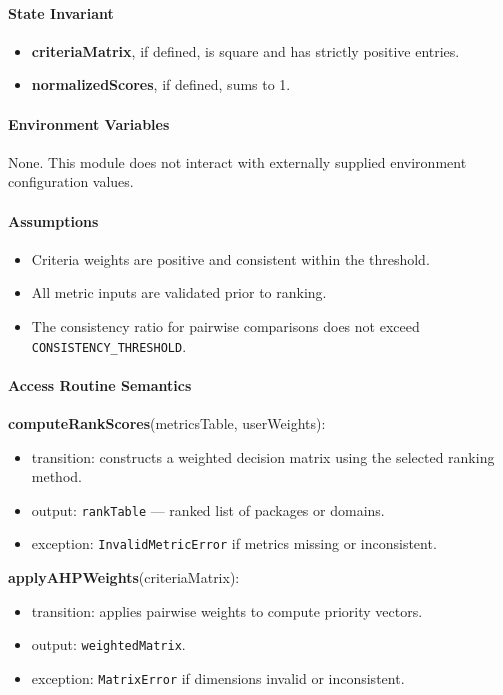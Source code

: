 \documentclass[12pt, titlepage]{article}
\begin{document}
  \paragraph{State Invariant}
  \begin{itemize}
    \item \textbf{criteriaMatrix}, if defined, is square and has strictly positive entries.
    \item \textbf{normalizedScores}, if defined, sums to 1.
  \end{itemize}

  \paragraph{Environment Variables}
  None. This module does not interact with externally supplied
  environment configuration values.

\paragraph{Assumptions}
\begin{itemize}
  \item Criteria weights are positive and consistent within the threshold.
  \item All metric inputs are validated prior to ranking.
  \item The consistency ratio for pairwise comparisons does not exceed \texttt{CONSISTENCY\_THRESHOLD}.
\end{itemize}

  \paragraph{Access Routine Semantics}

\noindent \textbf{computeRankScores}(metricsTable, userWeights):
\begin{itemize}
  \item transition: constructs a weighted decision matrix using the selected ranking method.
  \item output: \texttt{rankTable} — ranked list of packages or domains.
  \item exception: \texttt{InvalidMetricError} if metrics missing or inconsistent.
\end{itemize}

\noindent \textbf{applyAHPWeights}(criteriaMatrix):
\begin{itemize}
  \item transition: applies pairwise weights to compute priority vectors.
  \item output: \texttt{weightedMatrix}.
  \item exception: \texttt{MatrixError} if dimensions invalid or inconsistent.
\end{itemize}
\end{document}
